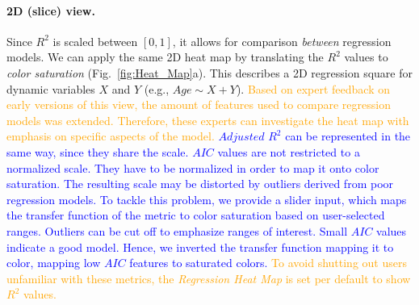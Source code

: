 \documentclass[journal]{style/vgtc} 			          %
\newcommand{\add}[1]{\textcolor{blue}{#1}}
\newcommand{\design}[1]{\textcolor{orange}{#1}}
\begin{document}
\paragraph{2D (slice) view.}
Since $R^2$ is scaled between $[0, 1]$, it allows for comparison \emph{between} regression models.
We can apply the same 2D heat map by translating the $R^2$ values to \emph{color saturation} (Fig.~\ref{fig:Heat_Map}a).
This describes a 2D regression square for dynamic variables $X$ and $Y$ (e.g., $Age \sim X + Y$).
\design{
Based on expert feedback on early versions of this view, the amount of features used to compare regression models was extended.
Therefore, these experts can investigate the heat map with emphasis on specific aspects of the model.
}
\add{
$Adjusted$ $R^2$ can be represented in the same way, since they share the scale.
$AIC$ values are not restricted to a normalized scale.
They have to be normalized in order to map it onto color saturation.
The resulting scale may be distorted by outliers derived from poor regression models.
To tackle this problem, we provide a slider input, which maps the transfer function of the metric to color saturation based on user-selected ranges.
Outliers can be cut off to emphasize ranges of interest.
Small $AIC$ values indicate a good model.
Hence, we inverted the transfer function mapping it to color, mapping low $AIC$ features to saturated colors.
}
\design{
To avoid shutting out users unfamiliar with these metrics, the \emph{Regression Heat Map} is set per default to show $R^2$ values.
}
\end{document}
